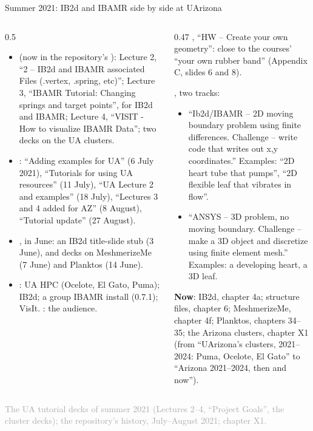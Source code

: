 \documentclass[aspectratio=169,11pt]{beamer}
\newcommand{\sourcecredit}[1]{\vfill\begin{flushright}\tiny\textcolor{DarkGray}{#1}\end{flushright}}
\begin{document}
\begin{frame}{Summer 2021: IB2d and IBAMR side by side at UArizona}
\label{fr:ua2021}
\begin{columns}[T,onlytextwidth]
\begin{column}{0.5\textwidth}
\scriptsize
\begin{itemize}\setlength{\itemsep}{3pt}
  \item {} (now in the repository's ): Lecture 2, ``2 -- IB2d and IBAMR associated Files (.vertex, .spring, etc)''; Lecture 3, ``IBAMR Tutorial: Changing springs and target points'', for IB2d and IBAMR; Lecture 4, ``VISIT - How to visualize IBAMR Data''; two decks on the UA clusters.
  \item {}: ``Adding examples for UA'' (6 July 2021), ``Tutorials for using UA resources'' (11 July), ``UA Lecture 2 and examples'' (18 July), ``Lectures 3 and 4 added for AZ'' (8 August), ``Tutorial update'' (27 August).
  \item {}, in June: an IB2d title-slide stub (3 June), and decks on MeshmerizeMe (7 June) and Planktos (14 June).
  \item {}: UA HPC (Ocelote, El Gato, Puma); IB2d; a group IBAMR install (0.7.1); VisIt. : the audience.
\end{itemize}
\end{column}
\begin{column}{0.47\textwidth}
\scriptsize
{}, ``HW -- Create your own geometry'': close to the courses' ``your own rubber band'' (Appendix C, slides 6 and 8).

\vspace{1mm}
, two tracks:
\begin{itemize}\setlength{\itemsep}{2pt}
  \item ``Ib2d/IBAMR -- 2D moving boundary problem using finite differences. Challenge -- write code that writes out x,y coordinates.'' Examples: ``2D heart tube that pumps'', ``2D flexible leaf that vibrates in flow''.
  \item ``ANSYS -- 3D problem, no moving boundary. Challenge -- make a 3D object and discretize using finite element mesh.'' Examples: a developing heart, a 3D leaf.
\end{itemize}
\begin{homebox}
\scriptsize \textbf{Now}: IB2d, chapter 4a; structure files, chapter 6; MeshmerizeMe, chapter 4f; Planktos, chapters 34--35; the Arizona clusters, chapter X1 (from ``UArizona's clusters, 2021--2024: Puma, Ocelote, El Gato'' to ``Arizona 2021--2024, then and now'').
\end{homebox}
\end{column}
\end{columns}
\sourcecredit{The UA tutorial decks of summer 2021 (Lectures 2--4, ``Project Goals'', the cluster decks); the repository's history, July--August 2021; chapter X1.}
\end{frame}
\end{document}
